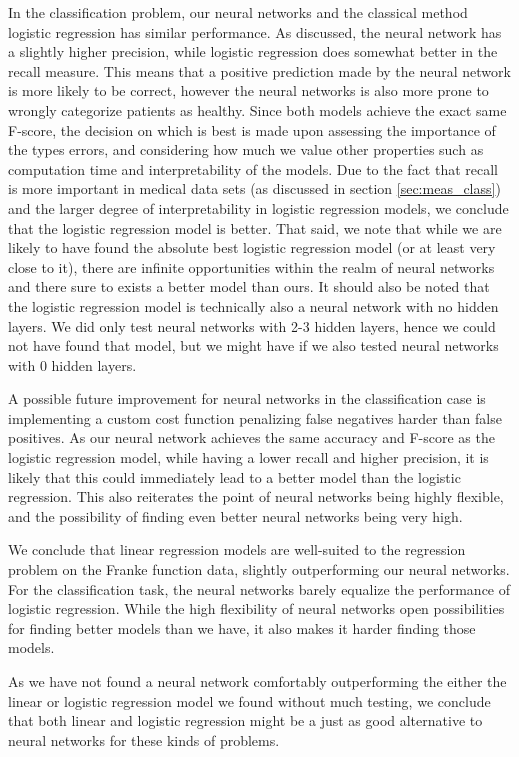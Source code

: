 In the classification problem, our neural networks and the classical method logistic regression has similar performance.
As discussed, the neural network has a slightly higher precision, while logistic regression does somewhat better in the recall measure.
This means that a positive prediction made by the neural network is more likely to be correct, however the neural networks is also more prone to wrongly categorize patients as healthy.
Since both models achieve the exact same F-score, the decision on which is best is made upon assessing the importance of the types errors, and considering how much we value other properties such as computation time and interpretability of the models.
Due to the fact that recall is more important in medical data sets (as discussed in section \ref{sec:meas_class}) and the larger degree of interpretability in logistic regression models, we conclude that the logistic regression model is better.
That said, we note that while we are likely to have found the absolute best logistic regression model (or at least very close to it), there are infinite opportunities within the realm of neural networks and there sure to exists a better model than ours.
It should also be noted that the logistic regression model is technically also a neural network with no hidden layers.
We did only test neural networks with 2-3 hidden layers, hence we could not have found that model, but we might have if we also tested neural networks with 0 hidden layers.

A possible future improvement for neural networks in the classification case is implementing a custom cost function penalizing false negatives harder than false positives.
As our neural network achieves the same accuracy and F-score as the logistic regression model, while having a lower recall and higher precision, it is likely that this could immediately lead to a better model than the logistic regression.
This also reiterates the point of neural networks being highly flexible, and the possibility of finding even better neural networks being very high.

We conclude that linear regression models are well-suited to the regression problem on the Franke function data, slightly outperforming our neural networks. 
For the classification task, the neural networks barely equalize the performance of logistic regression. 
While the high flexibility of neural networks open possibilities for finding better models than we have, it also makes it harder finding those models.

As we have not found a neural network comfortably outperforming the either the linear or logistic regression model we found without much testing, we conclude that both linear and logistic regression might be a just as good alternative to neural networks for these kinds of problems.
